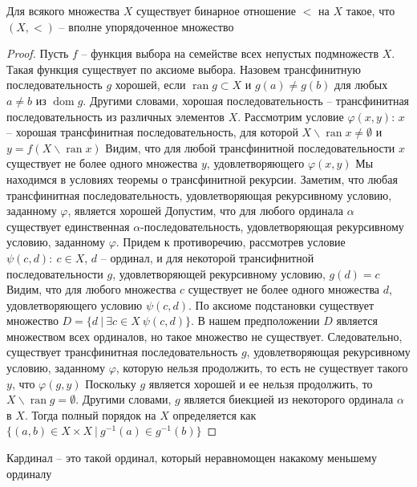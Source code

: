 \begin{theo}[Цермело]
Для всякого множества $X$ существует бинарное отношение $<$ на $X$ такое, что $(X, <)$ -- вполне упорядоченное множество
\end{theo}
\begin{proof}
Пусть $f$ -- функция выбора на семействе всех непустых подмножеств $X$. Такая функция существует по аксиоме выбора.
\vskip 0.1in
Назовем трансфинитную последовательность $g$ хорошей, если $\operatorname{ran} g \subset X$ и $g(a) \ne g(b)$ для любых $a \ne b$ из $\operatorname{dom} g$. Другими словами, хорошая последовательность -- трансфинитная последовательность из различных элементов $X$.
\vskip 0.1in
Рассмотрим условие $\varphi(x,y)$: $x$ -- хорошая трансфинитная последовательность, для которой $X \backslash \operatorname{ran} x \ne \emptyset$ и $y = f(X \backslash \operatorname{ran} x)$
\vskip 0.1in
Видим, что для любой трансфинитной последовательности $x$ существует не более одного множества $y$, удовлетворяющего $\varphi(x,y)$
\vskip 0.1in
Мы находимся в условиях теоремы о трансфинитной рекурсии. Заметим, что любая трансфинитная последовательность, удовлетворяющая рекурсивному условию, заданному $\varphi$, является хорошей
\vskip 0.1in
Допустим, что для любого ординала $\alpha$ существует единственная $\alpha$-последовательность, удовлетворяющая рекурсивному условию, заданному $\varphi$.
\vskip 0.1in
Придем к противоречию, рассмотрев условие $\psi(c,d):\ c \in X$, $d$ -- ординал, и для некоторой трансифнитной последовательности $g$, удовлетворяющей рекурсивному условию, $g(d) = c$
\vskip 0.1in
Видим, что для любого множества $c$ существует не более одного множества $d$, удовлетворяющего условию $\psi(c,d)$. По аксиоме подстановки существует множество $D = \{d\ |\ \exists c \in X\ \psi(c,d)\}$. В нашем предположении $D$ является множеством всех ординалов, но такое множество не существует.
\vskip 0.1in
Следовательно, существует трансфинитная последовательность $g$, удовлетворяющая рекурсивному условию, заданному $\varphi$, которую нельзя продолжить, то есть не существует такого $y$, что $\varphi(g,y)$
\vskip 0.1in
Поскольку $g$ является хорошей и ее нельзя продолжить, то $X \backslash \operatorname{ran} g = \emptyset$. Другими словами, $g$ является биекцией из некоторого ординала $\alpha$ в $X$. Тогда полный порядок на $X$ определяется как $\{(a,b) \in X \times X\ |\ g^{-1}(a) \in g^{-1}(b)\}$
\end{proof}

\begin{defn}
Кардинал -- это такой ординал, который неравномощен накакому меньшему ординалу
\end{defn}


